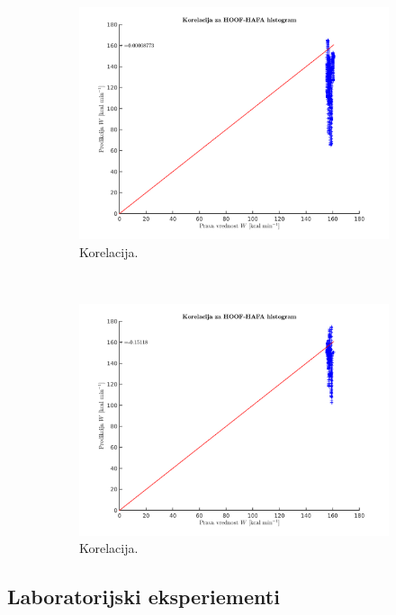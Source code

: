 \begin{figure}[htb]
	\centering
	\begin{subfigure}[t]{0.45\columnwidth}
		\includegraphics[width=\columnwidth]{./Slike/diag-normal-corr.png}
		\caption{Korelacija.}
		\label{fig:corr-diag-normal}
	\end{subfigure}
	~
	\begin{subfigure}[t]{0.45\columnwidth}
		\includegraphics[width=\columnwidth]{./Slike/diag-diag-corr.png}
		\caption{Korelacija.}
		\label{fig:corr-diag-diag}
	\end{subfigure}
	\caption[]{}
	\label{fig:corr-diag}
\end{figure}


\subsection{Laboratorijski eksperiementi}









